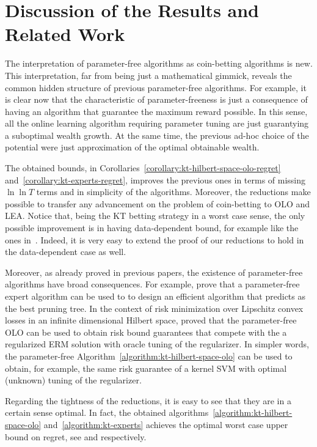 \section{Discussion of the Results and Related Work}
\label{sec:discussion}

The interpretation of parameter-free algorithms as coin-betting algorithms is new. This interpretation, far from being just a mathematical gimmick, reveals the common hidden structure of previous parameter-free algorithms. For example, it is clear now that the characteristic of parameter-freeness is just a consequence of having an algorithm that guarantee the maximum reward possible. In this sense, all the online learning algorithm requiring parameter tuning are just guarantying a suboptimal wealth growth. At the same time, the previous ad-hoc choice of the potential were just approximation of the optimal obtainable wealth.

The obtained bounds, in Corollaries~\ref{corollary:kt-hilbert-space-olo-regret} and~\ref{corollary:kt-experts-regret}, improves the previous ones in terms of missing $\ln \ln T$ terms and in simplicity of the algorithms. Moreover, the reductions make possible to transfer any advancement on the problem of coin-betting to \ac{OLO} and \ac{LEA}. Notice that, being the \ac{KT} betting strategy in a worst case sense, the only possible improvement is in having data-dependent bound, for example like the ones in~\cite{KoolenE15}. Indeed, it is very easy to extend the proof of our reductions to hold in the data-dependent case as well.

Moreover, as already proved in previous papers, the existence of parameter-free algorithms have broad consequences. For example, \citet{LuoS15} prove that a parameter-free expert algorithm can be used to to design an efficient algorithm that predicts as the best pruning tree. In the context of risk minimization over Lipschitz convex losses in an infinite dimensional Hilbert space, \citet{Orabona14} proved that the parameter-free \ac{OLO} can be used to obtain risk bound guarantees that compete with the a regularized \ac{ERM} solution with oracle tuning of the regularizer. In simpler words, the parameter-free Algorithm~\ref{algorithm:kt-hilbert-space-olo} can be used to obtain, for example, the same risk guarantee of a kernel \ac{SVM} with optimal (unknown) tuning of the regularizer.

Regarding the tightness of the reductions, it is easy to see that they are in a certain sense optimal. In fact, the obtained algorithms~\ref{algorithm:kt-hilbert-space-olo} and~\ref{algorithm:kt-experts} achieves the optimal worst case upper bound on regret, see \citet{Orabona13} and \citet{} respectively.

